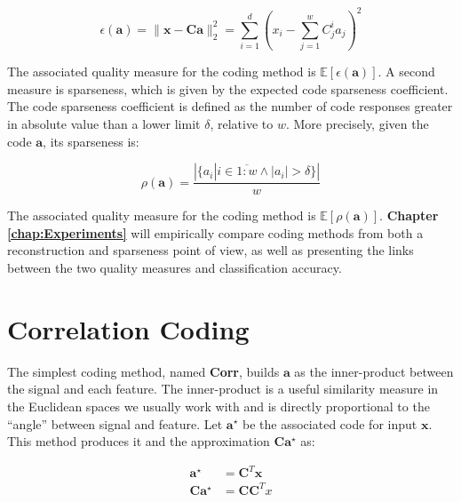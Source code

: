 \documentclass[12pt,a4paper,oneside,english]{UPBThesis}
\newcommand{\hcrange}[2]{\overline{{#1}\colon\!\!{#2}}}
\begin{document}
\begin{equation*}
\epsilon(\textbf{a}) = \| \textbf{x} - \textbf{C}\textbf{a} \|_2^2 = \sum_{i=1}^d {( x_i - \sum_{j=1}^w {C_j^i a_j})^2}
\end{equation*}

The associated quality measure for the coding method is $\mathbb{E} [ \epsilon(\textbf{a}) ]$. A second measure is sparseness, which is given by the expected code sparseness coefficient. The code sparseness coefficient is defined as the number of code responses greater in absolute value than a lower limit $\delta$, relative to $w$. More precisely, given the code $\textbf{a}$, its sparseness is:

\begin{equation*}
\rho(\textbf{a}) = \frac{\left| \{ a_i \left|\right. i \in \hcrange{1}{w} \wedge \left|a_i\right| > \delta \} \right|}{w}
\end{equation*}

The associated quality measure for the coding method is $\mathbb{E} [ \rho(\textbf{a}) ]$. \textbf{Chapter \ref{chap:Experiments}} will empirically compare coding methods from both a reconstruction and sparseness point of view, as well as presenting the links between the two quality measures and classification accuracy.

\section{Correlation Coding}
\label{sec:CorrelationCoding}

The simplest coding method, named \textbf{Corr}, builds $\textbf{a}$ as the inner-product between the signal and each feature. The inner-product is a useful similarity measure in the Euclidean spaces we usually work with and is directly proportional to the ``angle'' between signal and feature. Let $\textbf{a}^\star$ be the associated code for input $\textbf{x}$. This method produces it and the approximation $\textbf{C}\textbf{a}^\star$ as:

\begin{align*}
\textbf{a}^\star & = \textbf{C}^T\textbf{x} \\
\textbf{C}\textbf{a}^\star & = \textbf{C}\textbf{C}^Tx
\end{align*}
\end{document}
